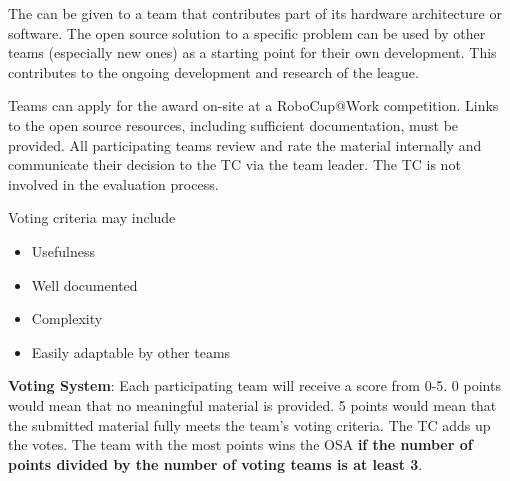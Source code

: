 

The  can be given to a team that contributes part of its hardware architecture or software.
The open source solution to a specific problem can be used by other teams (especially new ones) as a starting point for their own development.
This contributes to the ongoing development and research of the league.

Teams can apply for the award on-site at a RoboCup@Work competition.
Links to the open source resources, including sufficient documentation, must be provided.
All participating teams review and rate the material internally and communicate their decision to the TC via the team leader.
The TC is not involved in the evaluation process.

Voting criteria may include
\begin{itemize}
	\item Usefulness
	\item Well documented
	\item Complexity
	\item Easily adaptable by other teams
\end{itemize}

\textbf{Voting System}: Each participating team will receive a score from 0-5. 
0 points would mean that no meaningful material is provided. 
5 points would mean that the submitted material fully meets the team's voting criteria.
The TC adds up the votes. The team with the most points wins the OSA \textbf{if the number of points divided by the number of voting teams is at least 3}.